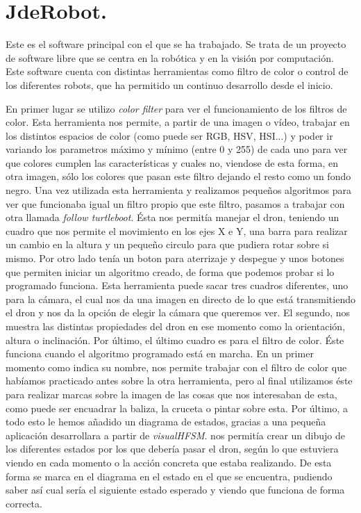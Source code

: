 \section{JdeRobot.}
\hspace{1 cm} Este es el software principal con el que se ha trabajado. Se trata de un proyecto de software libre que se centra en la rob\'otica y en la visi\'on por computaci\'on. Este software cuenta con distintas herramientas como filtro de color o control de los diferentes robots, que ha permitido un continuo desarrollo desde el inicio. 

En primer lugar se utilizo \textit{color filter} para ver el funcionamiento de los filtros de color. Esta herramienta nos permite, a partir de una imagen o v\'ideo, trabajar en los distintos espacios de color (como puede ser RGB, HSV, HSI...) y poder ir variando los parametros m\'aximo y m\'inimo (entre 0 y 255) de cada uno para ver que colores cumplen las caracter\'isticas y cuales no, viendose de esta forma, en otra imagen, s\'olo los colores que pasan este filtro dejando el resto como un fondo negro. 
Una vez utilizada esta herramienta y realizamos pequeños algoritmos para ver que funcionaba igual un filtro propio que este filtro, pasamos a trabajar con otra llamada \textit{follow turtleboot}. \'Esta  nos permit\'ia manejar el dron, teniendo un cuadro que nos permite el movimiento en los ejes X e Y, una barra para realizar un cambio en la altura y un pequeño circulo para que pudiera rotar sobre si mismo. Por otro lado ten\'ia un boton para aterrizaje y despegue y unos botones que permiten iniciar un algoritmo creado, de forma que podemos probar si lo programado funciona. Esta herramienta puede sacar tres cuadros diferentes, uno para la c\'amara, el cual nos da una imagen en directo de lo que est\'a transmitiendo el dron y nos da la opci\'on de elegir la c\'amara que queremos ver. El segundo, nos muestra las distintas propiedades del dron en ese momento como la orientaci\'on, altura o inclinaci\'on. Por \'ultimo, el \'ultimo cuadro es para el filtro de color. \'Este funciona cuando el algoritmo programado est\'a en marcha. En un primer momento como indica su nombre, nos permite trabajar con el filtro de color que hab\'iamos practicado antes sobre la otra herramienta, pero al final utilizamos \'este para realizar marcas sobre la imagen de las cosas que nos interesaban de esta, como puede ser encuadrar la baliza, la cruceta o pintar sobre esta. 
Por \'ultimo, a todo esto le hemos añadido un diagrama de estados, gracias a una pequeña aplicaci\'on desarrollara a partir de \textit{visualHFSM}. nos permit\'ia crear un dibujo de los diferentes estados por los que deber\'ia pasar el dron, seg\'un lo que estuviera viendo en cada momento o la acci\'on concreta que estaba realizando. De esta forma se marca en el diagrama en el estado en el que se encuentra, pudiendo saber as\'i cual ser\'ia el siguiente estado esperado y viendo que funciona de forma correcta.

